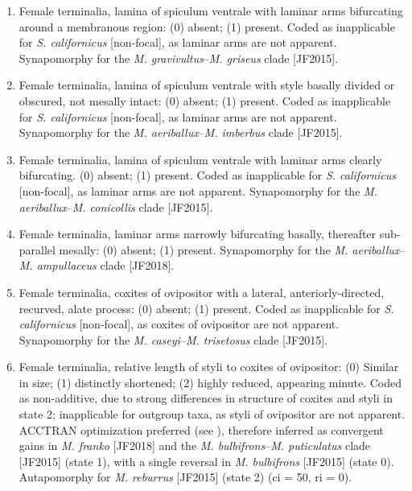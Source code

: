 \documentclass[fleqn,10pt,lineno]{wlpeerj} %
\begin{document}
\begin{enumerate}
		\item Female terminalia, lamina of spiculum ventrale with laminar arms bifurcating around a membranous region: (0) absent; (1) present. Coded as inapplicable for \textit{S. californicus} [non-focal], as laminar arms are not apparent. Synapomorphy for the \textit{M. gravivultus}--\textit{M. griseus} clade [JF2015].
		
		\item Female terminalia, lamina of spiculum ventrale with style basally divided or obscured, not mesally intact: (0) absent; (1) present. Coded as inapplicable for \textit{S. californicus} [non-focal], as laminar arms are not apparent. Synapomorphy for the \textit{M. aeriballux}--\textit{M. imberbus} clade [JF2015].

		\item Female terminalia, lamina of spiculum ventrale with laminar arms clearly bifurcating. (0) absent; (1) present. Coded as inapplicable for \textit{S. californicus} [non-focal], as laminar arms are not apparent. Synapomorphy for the \textit{M. aeriballux}--\textit{M. conicollis} clade [JF2015].
		
		\item Female terminalia, laminar arms narrowly bifurcating basally, thereafter sub-parallel mesally: (0) absent; (1) present. Synapomorphy for the \textit{M. aeriballux}--\textit{M. ampullaceus} clade [JF2018].

		\item Female terminalia, coxites of ovipositor with a lateral, anteriorly-directed, recurved, alate process: (0) absent; (1) present. Coded as inapplicable for \textit{S. californicus} [non-focal], as coxites of ovipositor are not apparent. Synapomorphy for the \textit{M. caseyi}--\textit{M. trisetosus} clade [JF2015].
		
		\item Female terminalia, relative length of styli to coxites of ovipositor: (0) Similar in size; (1) distinctly shortened; (2) highly reduced, appearing minute. Coded as non-additive, due to strong differences in structure of coxites and styli in state 2; inapplicable for outgroup taxa, as styli of ovipositor are not apparent. ACCTRAN optimization preferred (see \citealt{agnarsson2008}), therefore inferred as convergent gains in \textit{M. franko} [JF2018] and the \textit{M. bulbifrons}--\textit{M. puticulatus} clade [JF2015] (state 1), with a single reversal in \textit{M. bulbifrons} [JF2015] (state 0). Autapomorphy for \textit{M. reburrus} [JF2015] (state 2) (ci = 50, ri = 0).
		

\end{enumerate}
\end{document}
